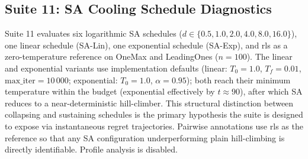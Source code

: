 \subsection{Suite 11: SA Cooling Schedule Diagnostics}
\label{subsec:suit11}




Suite 11 evaluates six logarithmic SA schedules ($d \in
\{0.5,1.0,2.0,4.0,8.0,16.0\}$), one linear schedule (SA-Lin), one exponential
schedule (SA-Exp), and \acrshort{rls} as a zero-temperature reference on OneMax
and LeadingOnes ($n=100$). The linear and exponential variants use
implementation defaults (linear: $T_0=1.0$, $T_f=0.01$,
$\text{max\_iter}=10\,000$; exponential: $T_0=1.0$, $\alpha=0.95$); both reach
their minimum temperature within the budget (exponential effectively by
$t \approx 90$), after which SA reduces to a near-deterministic hill-climber.
This structural distinction between collapsing and sustaining schedules is the
primary hypothesis the suite is designed to expose via instantaneous regret
trajectories. Pairwise annotations use \acrshort{rls} as the reference so that
any SA configuration underperforming plain hill-climbing is directly
identifiable. Profile analysis is disabled.

